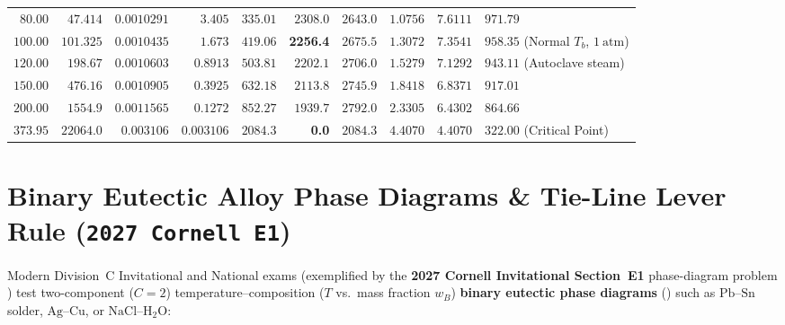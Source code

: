 \begin{center}
\begin{tabularx}{\linewidth}{@{}r r r r r r r r r X@{}}
$80.00$ & $47.414$ & $0.0010291$ & $3.405$ & $335.01$ & $2308.0$ & $2643.0$ & $1.0756$ & $7.6111$ & $971.79$ \\
$100.00$ & $101.325$ & $0.0010435$ & $1.673$ & $419.06$ & \textbf{2256.4} & $2675.5$ & $1.3072$ & $7.3541$ & $958.35$ (Normal $T_b$, $\SI{1}{\text{atm}}$) \\
$120.00$ & $198.67$ & $0.0010603$ & $0.8913$ & $503.81$ & $2202.1$ & $2706.0$ & $1.5279$ & $7.1292$ & $943.11$ (Autoclave steam) \\
$150.00$ & $476.16$ & $0.0010905$ & $0.3925$ & $632.18$ & $2113.8$ & $2745.9$ & $1.8418$ & $6.8371$ & $917.01$ \\
$200.00$ & $1554.9$ & $0.0011565$ & $0.1272$ & $852.27$ & $1939.7$ & $2792.0$ & $2.3305$ & $6.4302$ & $864.66$ \\
$373.95$ & $22064.0$ & $0.003106$ & $0.003106$ & $2084.3$ & \textbf{0.0} & $2084.3$ & $4.4070$ & $4.4070$ & $322.00$ (Critical Point) \\\bottomrule
\end{tabularx}
\end{center}

\section{Binary Eutectic Alloy Phase Diagrams \& Tie-Line Lever Rule (\texttt{2027 Cornell E1})}
\label{sec:05.4}

Modern Division~C Invitational and National exams (exemplified by the \textbf{2027 Cornell Invitational Section~E1} phase-diagram problem ) test two-component ($C = 2$) temperature--composition ($T$ vs.\ mass fraction $w_B$) \textbf{binary eutectic phase diagrams} () such as $\mathrm{Pb\text{--}Sn}$ solder, $\mathrm{Ag\text{--}Cu}$, or $\mathrm{NaCl\text{--}H_2O}$:


